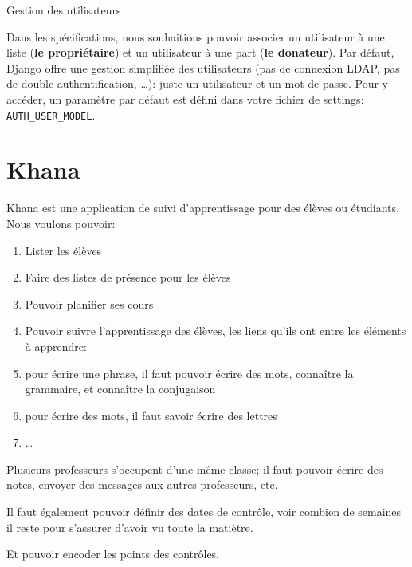 \documentclass[11pt]{amsbook}
\newenvironment{sidebar}[1][r]
  {\wrapfigure{#1}{0.5\textwidth}\tcolorbox}
  {\endtcolorbox\endwrapfigure}
\begin{document}
\begin{sidebar}
Gestion des utilisateurs
\end{sidebar}

Dans les spécifications, nous souhaitions pouvoir associer un utilisateur à une liste (\textbf{le propriétaire}) et un utilisateur à une part (\textbf{le donateur}). Par défaut, Django offre une gestion simplifiée des utilisateurs (pas de connexion LDAP, pas de double authentification, …​): juste un utilisateur et un mot de passe. Pour y accéder, un paramètre par défaut est défini dans votre fichier de settings: \texttt{AUTH\_USER\_MODEL}.


\hypertarget{x-khana}{\chapter{Khana}}
Khana est une application de suivi d’apprentissage pour des élèves ou étudiants.
Nous voulons pouvoir:


\begin{enumerate}

\item{Lister les élèves}

\item{Faire des listes de présence pour les élèves}

\item{Pouvoir planifier ses cours}

\item{Pouvoir suivre l’apprentissage des élèves, les liens qu’ils ont entre les éléments à apprendre:}

\item{pour écrire une phrase, il faut pouvoir écrire des mots, connaître la grammaire, et connaître la conjugaison}

\item{pour écrire des mots, il faut savoir écrire des lettres}

\item{…​}

\end{enumerate}


Plusieurs professeurs s’occupent d’une même classe; il faut pouvoir écrire des notes, envoyer des messages aux autres professeurs, etc.


Il faut également pouvoir définir des dates de contrôle, voir combien de semaines il reste pour s’assurer d’avoir vu toute la matiètre.


Et pouvoir encoder les points des contrôles.
\end{document}
